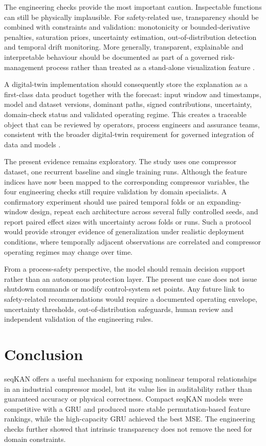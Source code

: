 \documentclass[conference]{IEEEtran}
\begin{document}
The engineering checks provide the most important caution. Inspectable functions can still be physically implausible. For safety-related use, transparency should be combined with constraints and validation: monotonicity or bounded-derivative penalties, saturation priors, uncertainty estimation, out-of-distribution detection and temporal drift monitoring. More generally, transparent, explainable and interpretable behaviour should be documented as part of a governed risk-management process rather than treated as a stand-alone visualization feature \cite{nist2023}.

A digital-twin implementation should consequently store the explanation as a first-class data product together with the forecast: input window and timestamps, model and dataset versions, dominant paths, signed contributions, uncertainty, domain-check status and validated operating regime. This creates a traceable object that can be reviewed by operators, process engineers and assurance teams, consistent with the broader digital-twin requirement for governed integration of data and models \cite{perno2022,peterson2025}.

The present evidence remains exploratory. The study uses one
compressor dataset, one recurrent baseline and single training
runs. Although the feature indices have now been mapped to
the corresponding compressor variables, the four engineering
checks still require validation by domain specialists. A
confirmatory experiment should use paired temporal folds or an
expanding-window design, repeat each architecture across several
fully controlled seeds, and report paired effect sizes with
uncertainty across folds or runs. Such a protocol would provide
stronger evidence of generalization under realistic deployment
conditions, where temporally adjacent observations are correlated
and compressor operating regimes may change over time.

From a process-safety perspective, the model should remain decision support rather than an autonomous protection layer. The present use case does not issue shutdown commands or modify control-system set points. Any future link to safety-related recommendations would require a documented operating envelope, uncertainty thresholds, out-of-distribution safeguards, human review and independent validation of the engineering rules.

\section{Conclusion}
seqKAN offers a useful mechanism for exposing nonlinear temporal relationships in an industrial compressor model, but its value lies in auditability rather than guaranteed accuracy or physical correctness. Compact seqKAN models were competitive with a GRU and produced more stable permutation-based feature rankings, while the high-capacity GRU achieved the best MSE. The engineering checks further showed that intrinsic transparency does not remove the need for domain constraints.
\end{document}
